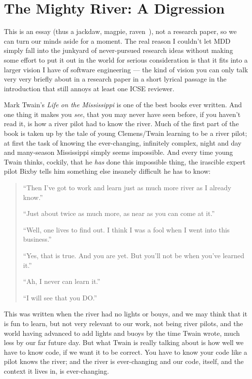 \documentclass[sigplan,screen]{acmart}
\begin{document}
\section{The Mighty River: A Digression}

This is an essay (thus a jackdaw, magpie, raven~\cite{doyleessay}), not a research paper, so we can turn our minds aside
for a moment.  The real reason I couldn't let MDD simply fall into the
junkyard of never-pursued research ideas without making some effort to put it
out in the world for serious consideration is that it fits into a
larger vision I have of software engineering --- the kind of vision you
can only talk very very briefly about in a research paper in a short lyrical passage in the
introduction that still annoys at least one ICSE reviewer.

Mark Twain's \emph{Life on the Mississippi} is one of the best books
ever written.  And one thing it makes you \emph{see}, that you may
never have seen before, if you haven't read it, is how a river pilot
had to know the river.  Much of the first part of the book is taken up
by the tale of young Clemens/Twain learning to be a river pilot; at
first the task of knowing the ever-changing, infinitely complex, night
and day and many-season Mississippi simply seems impossible.  And
every time young Twain thinks, cockily, that he \emph{has} done this
impossible thing, the irascible expert pilot Bixby tells him something
else insanely difficult he has to know:

\begin{quote}
``Then I've got to work and learn just as much more river as I already
know.''

``Just about twice as much more, as near as you can come at it.''

``Well, one lives to find out.  I think I was a fool when I went into
this business.''

``Yes, that is true.  And you are yet.  But you'll not be when you've
learned it.''

``Ah, I never can learn it.''

``I will see that you DO.''
\end{quote}

This was written when the river had no lights or bouys, and we may
think that it is fun to learn, but not very relevant to  our work, not
being river pilots, and the world having advanced to add lights and
buoys by the time Twain wrote, much less by our far future day.  But
what Twain is really talking about is how well we have to know code,
if we want it to be correct.  You have to know your code like a pilot
knows the river; and the river is ever-changing and our code, itself,
and the context it lives in, is ever-changing.
\end{document}
